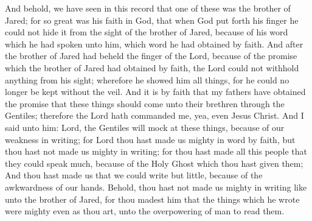 And behold, we have seen in this record that one of these was the brother of Jared; for so great was his faith in God, that when God put forth his finger he could not hide it from the sight of the brother of Jared, because of his word which he had spoken unto him, which word he had obtained by faith.
\bverse \iffalse And after the brother of Jared had beheld the finger of the Lord, because of the promise which the brother of Jared had obtained by faith, the Lord could not withhold anything from his sight; wherefore he showed him all things, for he could no longer be kept without the veil. \fi
And after the brother of Jared had beheld the finger of the Lord, because of the promise which the brother of Jared had obtained by faith, the Lord could not withhold anything from his sight; wherefore he showed him all things, for he could no longer be kept without the veil.
\bverse \iffalse And it is by faith that my fathers have obtained the promise that these things should come unto their brethren through the Gentiles; therefore the Lord hath commanded me, yea, even Jesus Christ. \fi
And it is by faith that my fathers have obtained the promise that these things should come unto their brethren through the Gentiles; therefore the Lord hath commanded me, yea, even Jesus Christ.
\bverse \iffalse And I said unto him: Lord, the Gentiles will mock at these things, because of our weakness in writing; for Lord thou hast made us mighty in word by faith, but thou hast not made us mighty in writing; for thou hast made all this people that they could speak much, because of the Holy Ghost which thou hast given them; \fi
And I said unto him: Lord, the Gentiles will mock at these things, because of our weakness in writing; for Lord thou hast made us mighty in word by faith, but thou hast not made us mighty in writing; for thou hast made all this people that they could speak much, because of the Holy Ghost which thou hast given them;
\bverse \iffalse And thou hast made us that we could write but little, because of the awkwardness of our hands. Behold, thou hast not made us mighty in writing like unto the brother of Jared, for thou madest him that the things which he wrote were mighty even as thou art, unto the overpowering of man to read them. \fi
And thou hast made us that we could write but little, because of the awkwardness of our hands. Behold, thou hast not made us mighty in writing like unto the brother of Jared, for thou madest him that the things which he wrote were mighty even as thou art, unto the overpowering of man to read them.
